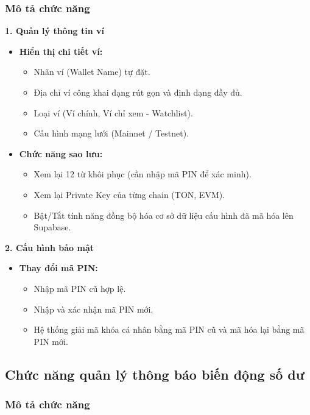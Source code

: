 \documentclass[a4paper]{report}
\begin{document}
\subsubsection{Mô tả chức năng}

\textbf{1. Quản lý thông tin ví}
\begin{itemize}
    \item \textbf{Hiển thị chi tiết ví:}
    \begin{itemize}
        \item Nhãn ví (Wallet Name) tự đặt.
        \item Địa chỉ ví công khai dạng rút gọn và định dạng đầy đủ.
        \item Loại ví (Ví chính, Ví chỉ xem - Watchlist).
        \item Cấu hình mạng lưới (Mainnet / Testnet).
    \end{itemize}
    
    \item \textbf{Chức năng sao lưu:}
    \begin{itemize}
        \item Xem lại 12 từ khôi phục (cần nhập mã PIN để xác minh).
        \item Xem lại Private Key của từng chain (TON, EVM).
        \item Bật/Tắt tính năng đồng bộ hóa cơ sở dữ liệu cấu hình đã mã hóa lên Supabase.
    \end{itemize}
\end{itemize}

\textbf{2. Cấu hình bảo mật}
\begin{itemize}
    \item \textbf{Thay đổi mã PIN:}
    \begin{itemize}
        \item Nhập mã PIN cũ hợp lệ.
        \item Nhập và xác nhận mã PIN mới.
        \item Hệ thống giải mã khóa cá nhân bằng mã PIN cũ và mã hóa lại bằng mã PIN mới.
    \end{itemize}
\end{itemize}

\subsection{Chức năng quản lý thông báo biến động số dư}

\subsubsection{Mô tả chức năng}
\end{document}
